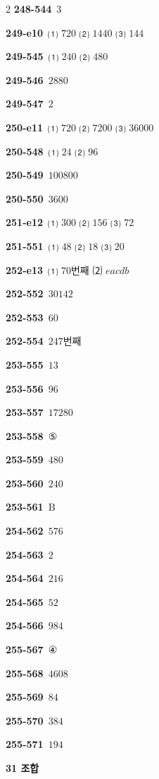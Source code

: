 \documentclass[10pt,a4paper]{article}
\newcommand{\pt}[1]{\mathrm{#1}}
\begin{document}
\begin{multicols}{2}
\noindent\textbf{248-544}\ $3$\par
\noindent\textbf{249-e10}\ ⑴ $720$ ⑵ $1440$ ⑶ $144$\par
\noindent\textbf{249-545}\ ⑴ $240$ ⑵ $480$\par
\noindent\textbf{249-546}\ $2880$\par
\noindent\textbf{249-547}\ $2$\par
\noindent\textbf{250-e11}\ ⑴ $720$ ⑵ $7200$ ⑶ $36000$\par
\noindent\textbf{250-548}\ ⑴ $24$ ⑵ $96$\par
\noindent\textbf{250-549}\ $100800$\par
\noindent\textbf{250-550}\ $3600$\par
\noindent\textbf{251-e12}\ ⑴ $300$ ⑵ $156$ ⑶ $72$\par
\noindent\textbf{251-551}\ ⑴ $48$ ⑵ $18$ ⑶ $20$\par
\noindent\textbf{252-e13}\ ⑴ $70$번째 ⑵ $eacdb$\par
\noindent\textbf{252-552}\ $30142$\par
\noindent\textbf{252-553}\ $60$\par
\noindent\textbf{252-554}\ $247$번째\par
\noindent\textbf{253-555}\ $13$\par
\noindent\textbf{253-556}\ $96$\par
\noindent\textbf{253-557}\ $17280$\par
\noindent\textbf{253-558}\ ⑤\par
\noindent\textbf{253-559}\ $480$\par
\noindent\textbf{253-560}\ $240$\par
\noindent\textbf{253-561}\ $\pt{B}$\par
\noindent\textbf{254-562}\ $576$\par
\noindent\textbf{254-563}\ $2$\par
\noindent\textbf{254-564}\ $216$\par
\noindent\textbf{254-565}\ $52$\par
\noindent\textbf{254-566}\ $984$\par
\noindent\textbf{255-567}\ ④\par
\noindent\textbf{255-568}\ $4608$\par
\noindent\textbf{255-569}\ $84$\par
\noindent\textbf{255-570}\ $384$\par
\noindent\textbf{255-571}\ $194$\par
\noindent\textbf{31 조합}\par\smallskip

\end{multicols}
\end{document}
